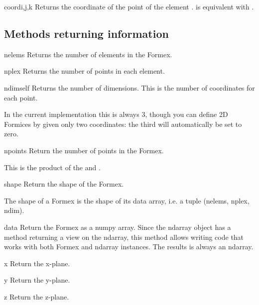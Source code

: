 \begin{methoddesc}{coord}{i,j,k}
Returns the coordinate  of the point  of the element .  is equivalent with .
\end{methoddesc}


\subsection{Methods returning information}

\begin{methoddesc}{nelems}{}
Returns the number of elements in the Formex.
\end{methoddesc}

\begin{methoddesc}{nplex}{}
Returns the number of points in each element.
\end{methoddesc}
    
\begin{methoddesc}{ndim}{self}
Returns the number of dimensions. This is the number of coordinates for each point. 

In the current implementation this is always 3, though you can define 2D Formices by given only two coordinates: the third will automatically be set to zero.
\end{methoddesc}

\begin{methoddesc}{npoints}{}
Return the number of points in the Formex.

This is the product of the  and  .
\end{methoddesc}
    
\begin{methoddesc}{shape}{}
Return the shape of the Formex.

The shape of a Formex is the shape of its data array,
i.e. a tuple (nelems, nplex, ndim).
\end{methoddesc}

\begin{methoddesc}{data}{}
  Return the Formex as a numpy array.
        Since the ndarray object has a method  returning a view on
        the ndarray, this method allows writing code that works with both
        Formex and ndarray instances. The results is always an ndarray.
\end{methoddesc}
\begin{methoddesc}{x}{}
  Return the x-plane.
\end{methoddesc}
\begin{methoddesc}{y}{}
  Return the y-plane.
\end{methoddesc}
\begin{methoddesc}{z}{}
  Return the z-plane.
\end{methoddesc}

